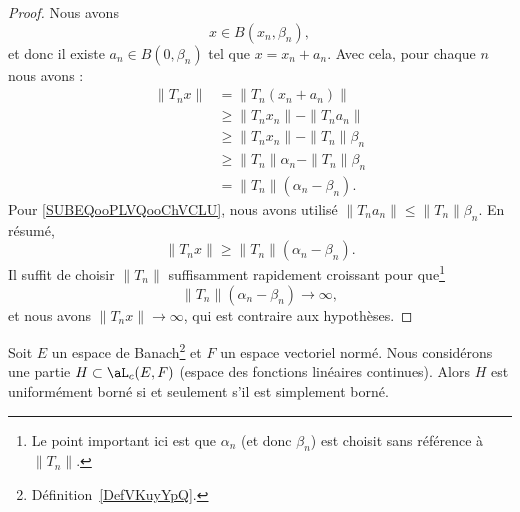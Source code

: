 \begin{proof}
    Nous avons
    \begin{equation}
        x\in B(x_n,\beta_n),
    \end{equation}
    et donc il existe \( a_n\in B(0,\beta_n)\) tel que \( x=x_n+a_n\). Avec cela, pour chaque \( n\) nous avons :
    \begin{subequations}
        \begin{align}
            \| T_nx \|&=\| T_n(x_n+a_n) \|\\
            &\geq\| T_nx_n \|-\| T_na_n \|\\
            &\geq \| T_nx_n \|-\| T_n \|\beta_n     \label{SUBEQooPLVQooChVCLU}\\
        &\geq \| T_n \|\alpha_n-\| T_n \|\beta_n\\
        &=\| T_n \|(\alpha_n-\beta_n).
        \end{align}
    \end{subequations}
    Pour \ref{SUBEQooPLVQooChVCLU}, nous avons utilisé \( \| T_na_n \|\leq \| T_n \|\beta_n\). En résumé,
    \begin{equation}
        \| T_nx \|\geq \| T_n \|(\alpha_n-\beta_n).
    \end{equation}
    Il suffit de choisir \( \| T_n \|\) suffisamment rapidement croissant pour que\footnote{Le point important ici est que \( \alpha_n\) (et donc \( \beta_n\)) est choisit sans référence à \( \| T_n \|\).}
    \begin{equation}
       \| T_n \|(\alpha_n-\beta_n)\to \infty,
    \end{equation}
    et nous avons \( \| T_nx \|\to \infty\), qui est contraire aux hypothèses.
\end{proof}

\begin{theorem} \label{ThoPFBMHBN}
    Soit \( E\) un espace de Banach\footnote{Définition~\ref{DefVKuyYpQ}.} et \( F\) un espace vectoriel normé. Nous considérons une partie \( H\subset \aL_c(E,F)\) (espace des fonctions linéaires continues). Alors \( H\) est uniformément borné si et seulement s'il est simplement borné.
\end{theorem}

